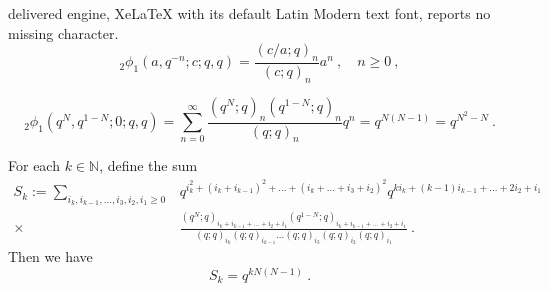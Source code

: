 \documentclass[10pt,a4paper]{amsart}
\begin{document}
delivered engine, XeLaTeX with its default Latin Modern text font, reports no missing character.
\begin{equation}\label{eq:phi_identity}
{ }_2 \phi_1\left(a, q^{-n} ; c ; q, q\right)=\frac{(c / a ; q)_n}{(c ; q)_n} a^n~,\quad n\geq 0~,
\end{equation}

\begin{equation}\label{eq:S_1_sum}
{ }_2 \phi_1\left(q^N, q^{1-N} ; 0 ; q , q\right)=\sum_{n=0}^{\infty} \frac{\left(q^N ; q\right)_n\left(q^{1-N} ; q\right)_n}{(q ; q)_n} q^n=q^{N(N-1)}=q^{N^2-N}~.
\end{equation}

\begin{lemma}\label{lemma:S_kqN_rel}
For each $k\in\mathds{N}$, define the sum
\begin{equation}
\begin{split}
    S_k:=\sum_{i_k,i_{k-1},\dots,i_3,i_2,i_1\geq 0}&q^{i_k^2+(i_k+i_{k-1})^2+\dots+(i_k+\dots+i_3+i_2)^2}q^{ki_k+(k-1)i_{k-1}+\dots+2i_2+i_1}
    \\
    \times&\frac{(q^N;q)_{i_k+i_{k-1}+\dots +i_2+i_1}(q^{1-N};q)_{i_k+i_{k-1}+\dots +i_2+i_1}}{(q;q)_{i_k}(q;q)_{i_{k-1}}\dots (q;q)_{i_3}(q;q)_{i_2}(q;q)_{i_1}}~.
\end{split}    
\end{equation}
Then we have 
\begin{equation}
    S_k=q^{kN(N-1)}~.
\end{equation}
\end{lemma}
\end{document}
